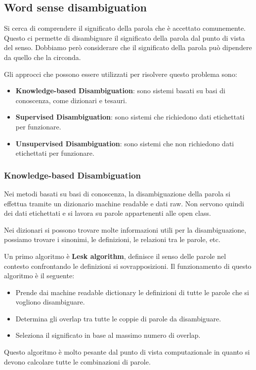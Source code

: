 \subsection{Word sense disambiguation}
Si cerca di comprendere il significato della parola che è accettato comunemente.
Questo ci permette di disambiguare il significato della parola dal punto di
vista del senso. Dobbiamo però considerare che il significato della parola può
dipendere da quello che la circonda.

Gli approcci che possono essere utilizzati per risolvere questo problema sono:
\begin{itemize}
      \item \textbf{Knowledge-based Disambiguation}: sono sistemi basati su basi
            di conoscenza, come dizionari e tesauri.
      \item \textbf{Supervised Disambiguation}: sono sistemi che richiedono dati
            etichettati per funzionare.
      \item \textbf{Unsupervised Disambiguation}: sono sistemi che non richiedono
            dati etichettati per funzionare.
\end{itemize}
\subsubsection{Knowledge-based Disambiguation}
Nei metodi basati su basi di conoscenza, la disambiguazione della parola si
effettua tramite un dizionario machine readable e dati raw. Non servono quindi
dei dati etichettati e si lavora su parole appartenenti alle open class.

Nei dizionari si possono trovare molte informazioni utili per la disambiguazione,
possiamo trovare i sinonimi, le definizioni, le relazioni tra le parole, etc.

Un primo algoritmo è \textbf{Lesk algorithm}, definisce il senso delle parole
nel contesto confrontando le definizioni si sovrapposizioni. Il funzionamento di
questo algoritmo è il seguente:
\begin{itemize}
      \item Prende dai machine readable dictionary le definizioni di tutte le
            parole che si vogliono disambiguare.
      \item Determina gli overlap tra tutte le coppie di parole da disambiguare.
      \item Seleziona il significato in base al massimo numero di overlap.
\end{itemize}
Questo algoritmo è molto pesante dal punto di vista computazionale in quanto
si devono calcolare tutte le combinazioni di parole.

